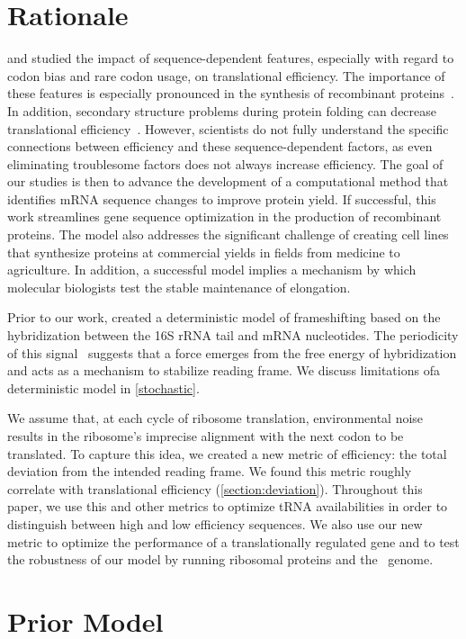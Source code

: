 \documentclass[12pt]{article}
\begin{document}
\section{Rationale}
\citet{kozak05} and \citet{kane95} studied the impact
of sequence-dependent features, especially with regard to codon bias 
and rare codon usage, on translational efficiency.  The importance of 
these features is especially pronounced in the synthesis of recombinant 
proteins~\cite{sorensen05}.  In addition, secondary structure problems 
during protein folding can decrease translational 
efficiency~\cite{kozak05}.  However, scientists do not fully
understand the specific connections between efficiency and these
sequence-dependent factors, as even eliminating troublesome factors
does not always increase efficiency. The goal of our studies is then to
advance the development of a computational method that identifies mRNA
sequence changes to improve protein yield. If
successful, this work streamlines gene sequence optimization in the
production of recombinant proteins. The model also addresses the
significant challenge of creating cell lines
that synthesize proteins at commercial yields in fields from
medicine to agriculture. In addition, a successful model implies a mechanism by
which molecular biologists test the stable maintenance of
elongation.

Prior to our work, \citet{lalit:jbsb} created a deterministic model of
frameshifting based on the hybridization between the 16S rRNA tail and
mRNA nucleotides.  The periodicity of this
signal~\cite{lalit:jbsb} suggests that a force emerges from the free
energy of hybridization and acts as a mechanism to
stabilize reading frame.  We discuss limitations ofa deterministic 
model in \autoref{stochastic}.

We assume that, at each cycle of ribosome translation, environmental
noise results in the ribosome's imprecise alignment
with the next codon to be translated.  To capture this idea, we
created a new metric of efficiency: the total deviation from the
intended reading frame.  We found this metric
roughly correlate with translational
efficiency (\autoref{section:deviation}).  Throughout this paper, we use this and other metrics to
optimize tRNA availabilities in order to distinguish between
high and low efficiency sequences. We also use our new
metric to optimize the performance of a translationally regulated gene
and to test the robustness of our model by running  ribosomal proteins and the
\ecoli\ genome.

\section{Prior Model}
\end{document}
